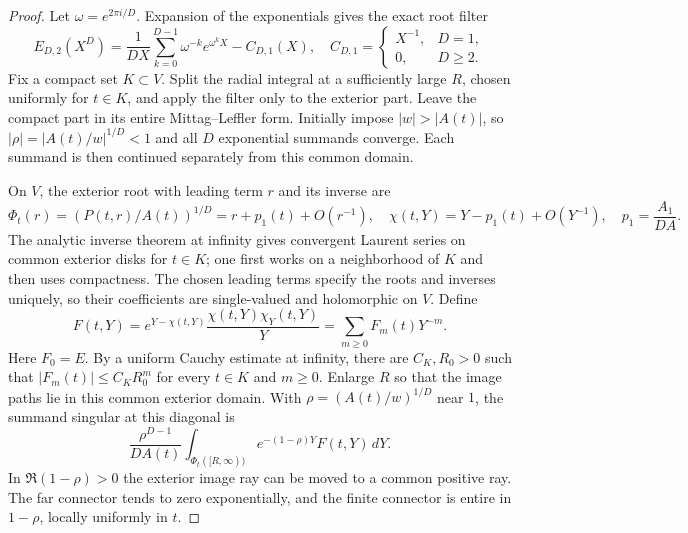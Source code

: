 \documentclass[11pt]{article}
\numberwithin{equation}{section}
\theoremstyle{definition}\newtheorem{definition}[theorem]{Definition}
\theoremstyle{remark}\newtheorem{remark}[theorem]{Remark}
\newcommand{\dd}{\,d}
\begin{document}
\begin{proof}
Let $\omega=e^{2\pi i/D}$. Expansion of the exponentials gives the exact
root filter
\begin{equation}\label{eq:filter}
 E_{D,2}(X^D)=\frac1{DX}\sum_{k=0}^{D-1}\omega^{-k}e^{\omega^kX}
 -C_{D,1}(X),\quad
 C_{D,1}=\begin{cases}X^{-1},&D=1,\\0,&D\ge2.\end{cases}
\end{equation}
Fix a compact set $K\subset V$. Split the radial integral at a
sufficiently large $R$, chosen uniformly for $t\in K$, and apply the
filter only to the exterior part. Leave the compact part in its entire
Mittag--Leffler form. Initially impose $|w|>|A(t)|$, so
$|\rho|=|A(t)/w|^{1/D}<1$ and all $D$ exponential summands converge.
Each summand is then continued separately from this common domain.

On $V$, the exterior root with leading term $r$ and its inverse are
\[
 \Phi_t(r)=(P(t,r)/A(t))^{1/D}=r+p_1(t)+O(r^{-1}),\quad
 \chi(t,Y)=Y-p_1(t)+O(Y^{-1}),\quad p_1=\frac{A_1}{DA}.
\]
The analytic inverse theorem at infinity gives convergent Laurent
series on common exterior disks for $t\in K$; one first works on a
neighborhood of $K$ and then uses compactness. The chosen leading terms
specify the roots and inverses uniquely, so their coefficients are
single-valued and holomorphic on $V$. Define
\begin{equation}\label{eq:Laurent}
 F(t,Y)=e^{Y-\chi(t,Y)}\frac{\chi(t,Y)\chi_Y(t,Y)}Y
       =\sum_{m\ge0}F_m(t)Y^{-m}.
\end{equation}
Here $F_0=E$. By a uniform Cauchy estimate at infinity, there are
$C_K,R_0>0$ such that $|F_m(t)|\le C_KR_0^m$ for every $t\in K$ and
$m\ge0$. Enlarge $R$ so that the image paths lie in this common
exterior domain.
With $\rho=(A(t)/w)^{1/D}$ near $1$, the summand singular at this diagonal is
\begin{equation}\label{eq:singular-summand}
 \frac{\rho^{D-1}}{DA(t)}
 \int_{\Phi_t([R,\infty))}e^{-(1-\rho)Y}F(t,Y)\dd Y.
\end{equation}
In $\Re(1-\rho)>0$ the exterior image ray can be moved to a common positive
ray. The far connector tends to zero exponentially, and the finite
connector is entire in $1-\rho$, locally uniformly in $t$.


\end{proof}
\end{document}
